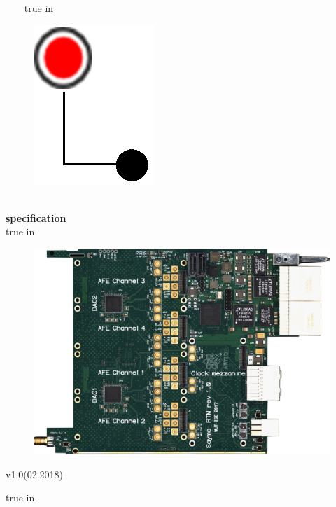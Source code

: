\begin{titlepage}



\textcolor{white}{xxx} 
 true in

\begin{figure}
	\begin{center}
		\vspace{-35pt}
		\includegraphics[scale=0.5]{img/kropki.eps}
	\end{center}
\end{figure}

\textbf{{\LARGE \nazwa}} \\
\linebreak
\textbf{ {\indent \indent \LARGE specification}}\\
 true in

\begin{figure}[htbp!]
	\centering
	\includegraphics[width=17cm]{img/top1.jpg}\\
\end{figure}
\begin{center}
	v1.0(02.2018)
\end{center}

 true in




\end{titlepage}
